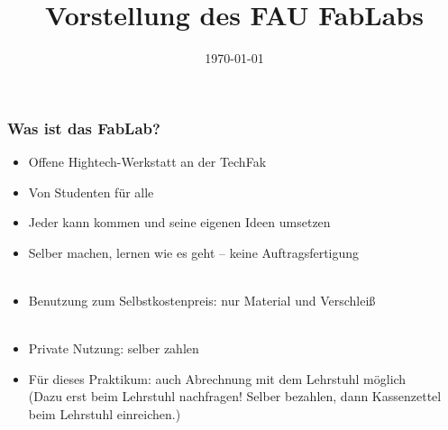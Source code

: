 \documentclass[t]{beamer}
\begin{document}


\date{\today}
\title[Vorstellung]{Vorstellung des FAU FabLabs}
\author{} %
\frame[plain,c]{\titlepage} %




\begin{frame}
    \frametitle{Was ist das FabLab?}
    \begin{itemize}
        \item Offene Hightech-Werkstatt an der TechFak
        \item Von Studenten für alle
        \item Jeder kann kommen und seine eigenen Ideen umsetzen
        \item Selber machen, lernen wie es geht -- keine Auftragsfertigung\\~
        \item Benutzung zum Selbstkostenpreis: nur Material und Verschleiß\\~
        \item Private Nutzung: selber zahlen
        \item Für dieses Praktikum: auch Abrechnung mit dem Lehrstuhl möglich \\(Dazu erst beim Lehrstuhl nachfragen! Selber bezahlen, dann Kassenzettel beim Lehrstuhl einreichen.)
    \end{itemize}

\end{frame}
\end{document}
